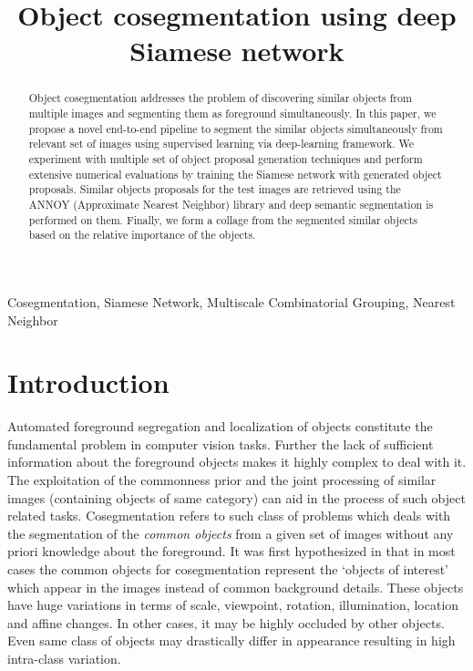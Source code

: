 \documentclass[conference]{IEEEtran}
\begin{document}
\title{Object cosegmentation using deep Siamese network}


\author{
 }


\maketitle

\begin{abstract}
Object cosegmentation addresses the problem of discovering similar objects from multiple images and segmenting them as foreground simultaneously. In this paper, we propose a novel end-to-end pipeline to segment the similar objects simultaneously from relevant set of images using supervised learning via deep-learning framework. We experiment with multiple set of object proposal generation techniques and perform extensive numerical evaluations by training the Siamese network with generated object proposals. Similar objects proposals for the test images are retrieved using the ANNOY (Approximate Nearest Neighbor) library and deep semantic segmentation is performed on them. Finally, we form a collage from the segmented similar objects based on the relative importance of the objects. 
\end{abstract}

\begin{IEEEkeywords}
Cosegmentation, Siamese Network, Multiscale Combinatorial Grouping, Nearest Neighbor
\end{IEEEkeywords}

\section{Introduction \label{sec:intro}}
Automated foreground segregation and localization of objects constitute the fundamental problem in computer vision tasks. Further the lack of sufficient information about the foreground objects makes it highly complex to deal with it. The exploitation of the commonness prior and the joint processing of similar images (containing objects of same category) can aid in the process of such object related tasks. Cosegmentation refers to such class of problems which deals with the segmentation of the \textit{common objects} from a given set of images without any priori knowledge about the foreground. It was first hypothesized in \cite{vicente2011object} that in most cases the common objects for cosegmentation represent the `objects of interest' which appear in the images instead of common background details. These objects have huge variations in terms of scale, viewpoint, rotation, illumination, location and affine changes. In other cases, it may be highly occluded by other objects. Even same class of objects may drastically differ in appearance resulting in high intra-class variation. 
\end{document}
